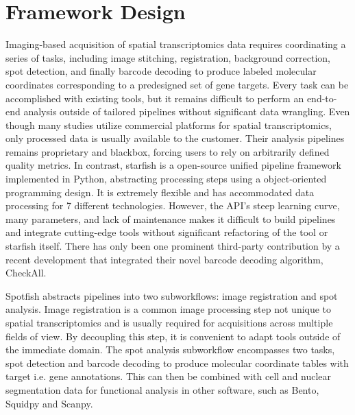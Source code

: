 \section{Framework Design}

Imaging-based acquisition of spatial transcriptomics data requires coordinating a series of tasks, including image stitching, registration, background correction, spot detection, and finally barcode decoding to produce labeled molecular coordinates corresponding to a predesigned set of gene targets. Every task can be accomplished with existing tools, but it remains difficult to perform an end-to-end analysis outside of tailored pipelines without significant data wrangling. Even though many studies utilize commercial platforms for spatial transcriptomics, only processed data is usually available to the customer. Their analysis pipelines remains proprietary and blackbox, forcing users to rely on arbitrarily defined quality metrics. In contrast, starfish is a open-source unified pipeline framework implemented in Python, abstracting processing steps using a object-oriented programming design\cite{othersStarfishOpenSource}. It is extremely flexible and has accommodated data processing for 7 different technologies. However, the API's steep learning curve, many parameters, and lack of maintenance makes it difficult to build pipelines and integrate cutting-edge tools without significant refactoring of the tool or starfish itself. There has only been one prominent third-party contribution by a recent development that integrated their novel barcode decoding algorithm, CheckAll\cite{cisarUnifiedPipelineFISH2023}.

Spotfish abstracts pipelines into two subworkflows: image registration and spot analysis. Image registration is a common image processing step not unique to spatial transcriptomics and is usually required for acquisitions across multiple fields of view. By decoupling this step, it is convenient to adapt tools outside of the immediate domain. The spot analysis subworkflow encompasses two tasks, spot detection and barcode decoding to produce molecular coordinate tables with target i.e. gene annotations. This can then be combined with cell and nuclear segmentation data for functional analysis in other software, such as Bento\cite{mahBentoToolkitSubcellular2022}, Squidpy\cite{pallaSquidpyScalableFramework2021} and Scanpy\cite{wolfSCANPYLargescaleSinglecell2018}.

